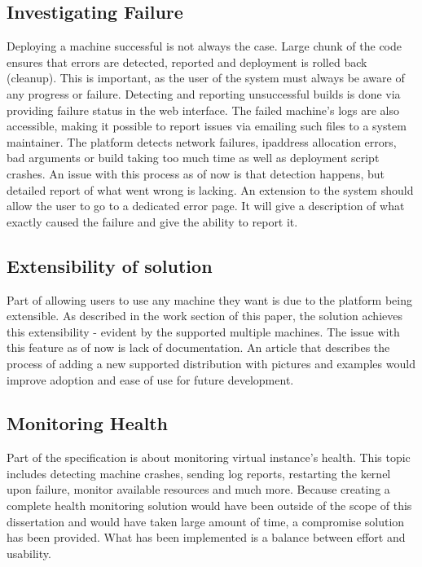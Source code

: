 \documentclass{article}
\begin{document}
\subsection{Investigating Failure}
Deploying a machine successful is not always the case. Large chunk of the code ensures that errors are detected, reported and deployment is rolled back (cleanup). This is important, as the user of the system must always be aware of any progress or failure.
Detecting and reporting unsuccessful builds is done via providing failure status in the web interface. The failed machine's logs are also accessible, making it possible to report issues via emailing such files to a system maintainer. The platform detects network failures, \gls{ipaddress} allocation errors, bad arguments or build taking too much time as well as deployment script crashes. 
An issue with this process as of now is that detection happens, but detailed report of what went wrong is lacking. An extension to the system should allow the user to go to a dedicated error page. It will give a description of what exactly caused the failure and give the ability to report it.

  
\subsection{Extensibility of solution}
Part of allowing users to use any machine they want is due to the platform being extensible. As described in the work section of this paper, the solution achieves this extensibility - evident by the supported multiple machines. 
The issue with this feature as of now is lack of documentation. An article that describes the process of adding a new supported distribution with pictures and examples would  improve adoption and ease of use for future development.

\subsection{Monitoring Health}
Part of the specification is about monitoring virtual instance's health. This topic includes detecting machine crashes, sending log reports, restarting the \gls{kernel} upon failure, monitor available resources and much more. Because creating a complete health monitoring solution would have been outside of the scope of this dissertation and would have taken large amount of time, a compromise solution has been provided. What has been implemented is a balance between effort and usability. 
\end{document}
